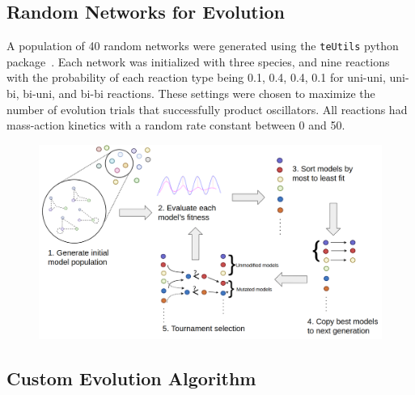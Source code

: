 \documentclass[12pt]{report}
\begin{document}
\subsection{Random Networks for Evolution}
A population of 40 random networks were generated using the {\tt teUtils} python package~\cite{SauroteUtils_2020}. Each network was initialized with three species, and nine reactions with the probability of each reaction type being 0.1, 0.4, 0.4, 0.1 for uni-uni, uni-bi, bi-uni, and bi-bi reactions. These settings were chosen to maximize the number of evolution trials that successfully product oscillators. All reactions had mass-action kinetics with a random rate constant between 0 and 50. 
\begin{figure}
    \includegraphics[width=12cm]{images/algorithm.png}
    \label{fig:algorithm}
\end{figure}

\subsection{Custom Evolution Algorithm}
\end{document}
